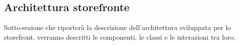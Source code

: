 \subsection{Architettura storefronte}

Sotto-sezione che riporterà la descrizione dell'architettura sviluppata per lo storefront.
verranno descritti le componenti, le classi e le interazioni tra loro.
